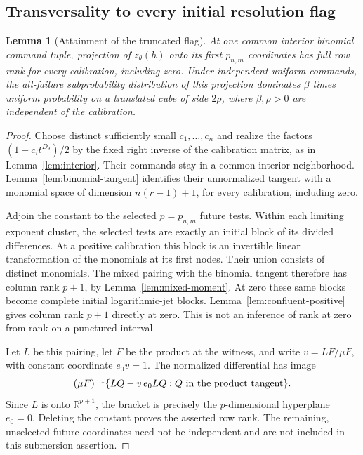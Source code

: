 \documentclass[11pt]{amsart}
\newtheorem{lemma}[theorem]{Lemma}
\theoremstyle{definition}\newtheorem{definition}[theorem]{Definition}
\theoremstyle{remark}\newtheorem{remark}[theorem]{Remark}
\newcommand{\R}{\mathbb R}\newcommand{\N}{\mathbb N}\newcommand{\C}{\mathbb C}
\begin{document}
\subsection{Transversality to every initial resolution flag}
\begin{lemma}[Attainment of the truncated flag]\label{lem:attained-flag}
At one common interior binomial command tuple, projection of
$z_\theta(h)$ onto its first $p_{n,m}$ coordinates has full row rank
for every calibration, including zero. Under independent uniform commands,
the all-failure subprobability distribution of this projection dominates
$\beta$ times uniform probability on a translated cube of side $2\rho$,
where $\beta,\rho>0$ are independent of the calibration.
\end{lemma}
\begin{proof}
Choose distinct sufficiently small $c_1,\ldots,c_n$ and realize the
factors $(1+c_it^{D_\theta})/2$ by the fixed right inverse of the
calibration matrix, as in Lemma~\ref{lem:interior}. Their commands stay
in a common interior neighborhood. Lemma~\ref{lem:binomial-tangent}
identifies their unnormalized tangent with a monomial space of dimension
$n(r-1)+1$, for every calibration, including zero.

Adjoin the constant to the selected $p=p_{n,m}$ future tests. Within
each limiting exponent cluster, the selected tests are exactly an initial
block of its divided differences. At a positive calibration this block
is an invertible linear transformation of the monomials at its first
nodes. Their union consists of distinct monomials. The mixed pairing
with the binomial tangent therefore has column rank $p+1$, by
Lemma~\ref{lem:mixed-moment}. At zero these same blocks become complete
initial logarithmic-jet blocks. Lemma~\ref{lem:confluent-positive}
gives column rank $p+1$ directly at zero. This is not an inference of
rank at zero from rank on a punctured interval.

Let $L$ be this pairing, let $F$ be the product at the witness, and
write $v=LF/\mu F$, with constant coordinate $e_0v=1$.
The normalized differential has image
\[
 (\mu F)^{-1}\{LQ-v\,e_0LQ:Q\hbox{ in the product tangent}\}.
\]
Since $L$ is onto $\R^{p+1}$, the bracket is precisely the
$p$-dimensional hyperplane $e_0=0$. Deleting the constant proves the
asserted row rank. The remaining, unselected future coordinates need not
be independent and are not included in this submersion assertion.


\end{proof}
\end{document}
